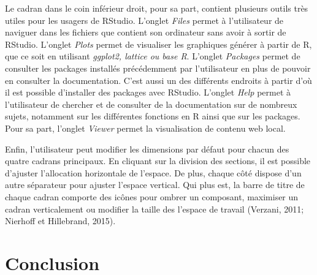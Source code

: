\documentclass[
  letterpaper,
  DIV=11,
  numbers=noendperiod]{scrreprt}
\begin{document}
Le cadran dans le coin inférieur droit, pour sa part, contient plusieurs
outils très utiles pour les usagers de RStudio. L'onglet \emph{Files}
permet à l'utilisateur de naviguer dans les fichiers que contient son
ordinateur sans avoir à sortir de RStudio. L'onglet \emph{Plots} permet
de visualiser les graphiques générer à partir de R, que ce soit en
utilisant \emph{ggplot2, lattice ou base R}. L'onglet \emph{Packages}
permet de consulter les packages installés précédemment par
l'utilisateur en plus de pouvoir en consulter la documentation. C'est
aussi un des différents endroits à partir d'où il est possible
d'installer des packages avec RStudio. L'onglet \emph{Help} permet à
l'utilisateur de chercher et de consulter de la documentation sur de
nombreux sujets, notamment sur les différentes fonctions en R ainsi que
sur les packages. Pour sa part, l'onglet \emph{Viewer} permet la
visualisation de contenu web local.

Enfin, l'utilisateur peut modifier les dimensions par défaut pour chacun
des quatre cadrans principaux. En cliquant sur la division des sections,
il est possible d'ajuster l'allocation horizontale de l'espace. De plus,
chaque côté dispose d'un autre séparateur pour ajuster l'espace
vertical. Qui plus est, la barre de titre de chaque cadran comporte des
icônes pour ombrer un composant, maximiser un cadran verticalement ou
modifier la taille des l'espace de travail (Verzani, 2011; Nierhoff et
Hillebrand, 2015).

\section{Conclusion}\label{conclusion-1}
\end{document}
